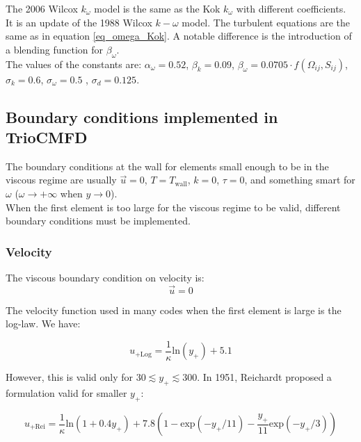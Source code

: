 The 2006 Wilcox $k_\omega$ model \cite{Wilcox2006} is the same as the Kok $k_\omega$ with different coefficients. It is an update of the 1988 Wilcox $k-\omega$ model. The turbulent equations are the same as in equation \ref{eq_omega_Kok}. A notable difference is the introduction of a blending function for $\beta_{\omega}$. \\

The values of the constants are: $\alpha_{\omega} = 0.52$, $\beta_{k} = 0.09$, $\beta_{\omega} = 0.0705\cdot f(\Omega_{ij},S_{ij})$, $\sigma_k = 0.6$, $\sigma_{\omega} = 0.5$ , $\sigma_d = 0.125$.

\subsection{Boundary conditions implemented in TrioCMFD}

The boundary conditions at the wall for elements small enough to be in the viscous regime are usually $\overrightarrow{u} = 0$, $T = T_{\text{wall}}$, $k=0$, $\tau = 0$, and something smart for $\omega$ ($\omega \rightarrow +\infty$ when $y\rightarrow0$).\\

When the first element is too large for the viscous regime to be valid, different boundary conditions must be implemented. 

\subsubsection{Velocity}

The viscous boundary condition on velocity is:
\begin{equation} \label{velocity_0}
	\overrightarrow{u} = 0
\end{equation}

The velocity function used in many codes when the first element is large is the log-law. We have:

\begin{equation}
	u_{+\text{Log}} = \frac{1}{\kappa}\text{ln}(y_+) + 5.1
\end{equation}

However, this is valid only for $30 \lesssim y_+ \lesssim 300$. In 1951, Reichardt \cite{Reichardt1951} proposed a formulation valid for smaller $y_+$:

\begin{equation}
	u_{+\text{Rei}} = \frac{1}{\kappa}\text{ln}(1+0.4y_+) + 7.8\left(1-\text{exp}(-y_+/11)-\frac{y_+}{11}\text{exp}(-y_+/3)\right)
\end{equation}

